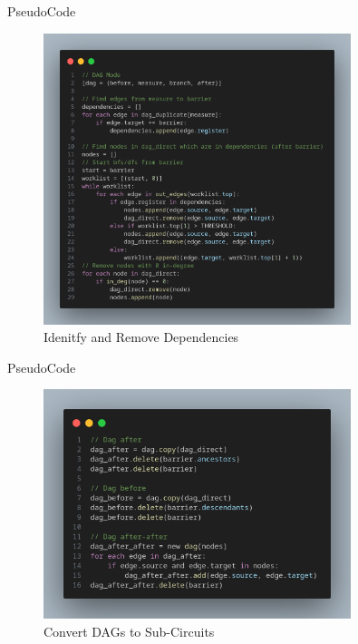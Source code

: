 \documentclass[10pt]{beamer}
\begin{document}
\begin{frame}{PseudoCode}
  \begin{figure}
    \centering
    \includegraphics[width=0.8\textwidth]{Images/code_2.png}
    \caption{Idenitfy and Remove Dependencies}
  \end{figure}
\end{frame}

\begin{frame}{PseudoCode}
  \begin{figure}
    \centering
    \includegraphics[width=0.8\textwidth]{Images/code_3.png}
    \caption{Convert DAGs to Sub-Circuits}
  \end{figure}
\end{frame}
\end{document}
